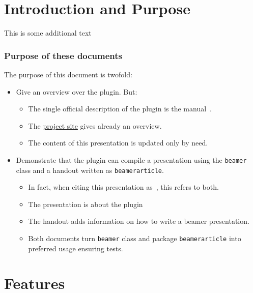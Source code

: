\begin{frame}
  \tableofcontents
\end{frame}

\section{Introduction and Purpose}

This is some additional text 

\begin{frame}
  \frametitle{Purpose of these documents }
  The purpose of this document is twofold:
  \begin{itemize}
    \item Give an overview over the plugin. 
    \alert{But: }
    \begin{itemize}
      \item The single official description of the plugin is the manual~\cite{LatexPlugin}.
      \item The 
      \href{http://simuline.eu/LatexMavenPlugin/index.html}{project site} 
      gives already an overview. 
      \item 
      The content of this presentation is updated only by need. 
    \end{itemize}
    
    \item Demonstrate that the plugin can compile a presentation using the \texttt{beamer} class 
    and a handout written as \texttt{beamerarticle}. 

    \begin{itemize}
      \item In fact, when citing this presentation as~\cite{PresBeamer}, 
      this refers to both. 
      \item The presentation is about the plugin 
      \item The handout adds information on how to write a beamer presentation. 
      \item Both documents turn \texttt{beamer} class and package \texttt{beamerarticle} into preferred usage 
      ensuring tests. 
    \end{itemize}
  \end{itemize}
  
\end{frame}


\section{Features}

